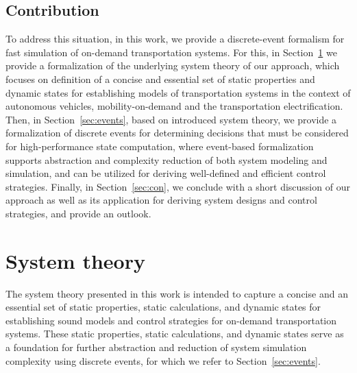 \documentclass[graybox]{svmult}
\begin{document}
\subsection{Contribution}
To address this situation, in this work, we provide a discrete-event formalism for fast simulation of on-demand transportation systems.
For this, in Section~\ref{sec:theory} we provide a formalization of the underlying system theory of our approach, which focuses on definition of a concise and essential set of static properties and dynamic states for establishing models of transportation systems in the context of autonomous vehicles, mobility-on-demand and the transportation electrification.
Then, in Section~\ref{sec:events}, based on introduced system theory, we provide a formalization of discrete events for determining decisions that must be considered for high-performance state computation, where event-based formalization supports abstraction and complexity reduction of both system modeling and simulation, and can be utilized for deriving well-defined and efficient control strategies. 
Finally, in Section~\ref{sec:con}, we conclude with a short discussion of our approach as well as its application for deriving system designs and control strategies, and provide an outlook.

\section{System theory}
\label{sec:theory}

The system theory presented in this work is intended to capture a concise and an essential set of static properties, static calculations, and dynamic states for establishing sound models and control strategies for on-demand transportation systems.
These static properties, static calculations, and dynamic states serve as a foundation for further abstraction and reduction of system simulation complexity using discrete events, for which we refer to Section~\ref{sec:events}.
\end{document}
